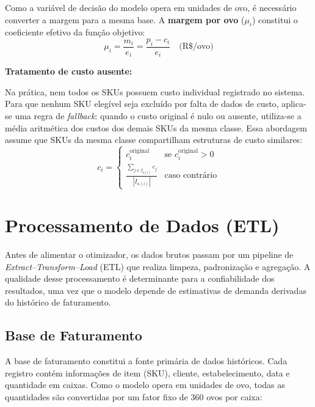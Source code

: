 \documentclass[11pt,a4paper]{article}
\begin{document}
Como a variável de decisão do modelo opera em unidades de ovo, é necessário
converter a margem para a mesma base. A \textbf{margem por ovo} ($\mu_i$)
constitui o coeficiente efetivo da função objetivo:
\begin{equation}\label{eq:auto:004}
\mu_i = \frac{m_i}{e_i} = \frac{p_i - c_i}{e_i} \quad \text{(R\$/ovo)}
\end{equation}

\textbf{Tratamento de custo ausente:}

Na prática, nem todos os SKUs possuem custo individual registrado no sistema.
Para que nenhum SKU elegível seja excluído por falta de dados de custo,
aplica-se uma regra de \textit{fallback}: quando o custo original é nulo ou
ausente, utiliza-se a média aritmética dos custos dos demais SKUs da mesma
classe. Essa abordagem assume que SKUs da mesma classe compartilham estruturas
de custo similares:
\begin{equation}\label{eq:auto:005}
c_i = \begin{cases}
c_i^{\text{original}} & \text{se } c_i^{\text{original}} > 0 \\[4pt]
\displaystyle\frac{\sum_{j \in I_{\kappa(i)}} c_j}{|I_{\kappa(i)}|} & \text{caso contrário}
\end{cases}
\end{equation}

\section{Processamento de Dados (ETL)}

Antes de alimentar o otimizador, os dados brutos passam por um pipeline de
\textit{Extract--Transform--Load} (ETL) que realiza limpeza, padronização e
agregação. A qualidade desse processamento é determinante para a confiabilidade
dos resultados, uma vez que o modelo depende de estimativas de demanda
derivadas do histórico de faturamento.

\subsection{Base de Faturamento}

A base de faturamento constitui a fonte primária de dados históricos. Cada
registro contém informações de item (SKU), cliente, estabelecimento, data e
quantidade em caixas. Como o modelo opera em unidades de ovo, todas as
quantidades são convertidas por um fator fixo de 360 ovos por caixa:
\end{document}
